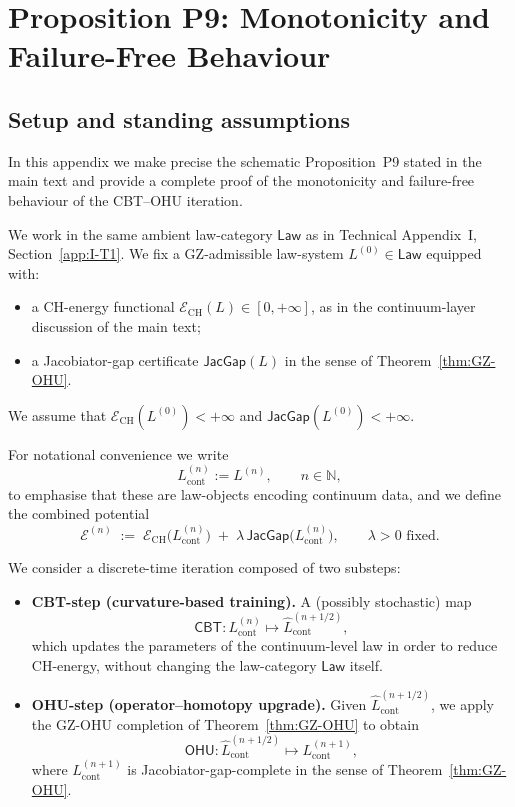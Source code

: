 \documentclass[11pt]{book}
\theoremstyle{plain}
\theoremstyle{definition}
\begin{document}
\section{Proposition P9: Monotonicity and Failure-Free Behaviour}
\label{app:I-P9}

\subsection*{Setup and standing assumptions}


In this appendix we make precise the schematic Proposition~P9 stated in
the main text and provide a complete proof of the monotonicity and
failure-free behaviour of the CBT--OHU iteration.

We work in the same ambient law-category \(\mathsf{Law}\) as in
Technical Appendix~I, Section~\ref{app:I-T1}.  We fix a GZ-admissible
law-system \(L^{(0)}\in\mathsf{Law}\) equipped with:
\begin{itemize}
  \item a CH-energy functional
        \(\mathcal{E}_{\mathrm{CH}}(L)\in[0,+\infty]\), as in the
        continuum-layer discussion of the main text;
  \item a Jacobiator-gap certificate \(\mathsf{JacGap}(L)\) in the
        sense of Theorem~\ref{thm:GZ-OHU}.
\end{itemize}
We assume that \(\mathcal{E}_{\mathrm{CH}}(L^{(0)})<+\infty\) and
\(\mathsf{JacGap}(L^{(0)})<+\infty\).

For notational convenience we write
\[
  L_{\mathrm{cont}}^{(n)} := L^{(n)},\qquad n\in\mathbb{N},
\]
to emphasise that these are law-objects encoding continuum data, and
we define the combined potential
\[
  \mathcal{E}^{(n)}
  \;:=\;
  \mathcal{E}_{\mathrm{CH}}\bigl(L_{\mathrm{cont}}^{(n)}\bigr)
  \;+\;
  \lambda\,\mathsf{JacGap}\bigl(L_{\mathrm{cont}}^{(n)}\bigr),
  \qquad \lambda>0 \text{ fixed}.
\]



We consider a discrete-time iteration composed of two substeps:

\begin{itemize}
  \item \textbf{CBT-step (curvature-based training).}
    A (possibly stochastic) map
    \[
      \mathsf{CBT} :
      L_{\mathrm{cont}}^{(n)}
      \longmapsto
      \widehat{L}_{\mathrm{cont}}^{(n+1/2)},
    \]
    which updates the parameters of the continuum-level law in order to
    reduce CH-energy, without changing the law-category \(\mathsf{Law}\)
    itself.
  \item \textbf{OHU-step (operator--homotopy upgrade).}
    Given \(\widehat{L}_{\mathrm{cont}}^{(n+1/2)}\), we apply the
    GZ-OHU completion of Theorem~\ref{thm:GZ-OHU} to obtain
    \[
      \mathsf{OHU} :
      \widehat{L}_{\mathrm{cont}}^{(n+1/2)}
      \longmapsto
      L_{\mathrm{cont}}^{(n+1)},
    \]
    where \(L_{\mathrm{cont}}^{(n+1)}\) is Jacobiator-gap-complete in
    the sense of Theorem~\ref{thm:GZ-OHU}.
\end{itemize}
\end{document}
